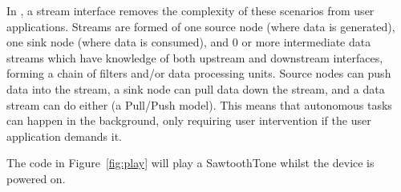 In \CON, a stream interface removes the complexity of these scenarios from user applications. Streams are formed of one source node (where data is generated), one sink node (where data is consumed), and 0 or more intermediate data streams which have knowledge of both upstream and downstream interfaces, forming a chain of filters and/or data processing units. Source nodes can push data into the stream, a sink node can pull data down the stream, and a data stream can do either (a Pull/Push model). This means that autonomous tasks can happen in the background, only requiring user intervention if the user application demands it.

The code in Figure~\ref{fig:play} will play a SawtoothTone whilst the device is powered on.
